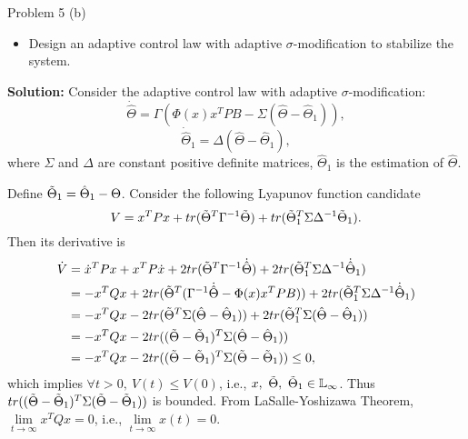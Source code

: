 \documentclass[8pt]{beamer}
\begin{document}
\begin{frame}[t]{Problem 5 (b)}
  \begin{block}{}
\begin{itemize}
  \item[(b)] Design an adaptive control law with adaptive $\sigma$-modification to stabilize the system.
\end{itemize}
  \end{block}

\textbf{Solution:}
Consider the adaptive control law with adaptive $\sigma$-modification:
    \begin{equation*}
        \dot{\hat{\Theta}}=\Gamma(\Phi(x)x^TPB-\Sigma(\hat{\Theta}-\hat{\Theta}_1)),
    \end{equation*}
    \begin{equation*}
        \dot{\hat{\Theta}}_1=\Delta(\hat{\Theta}-\hat{\Theta}_1),
    \end{equation*}
    where $\Sigma$ and $\Delta$ are constant positive definite matrices, ${\hat{\Theta}}_1$ is the estimation of $\hat{\Theta}$.

    Define $\Tilde{\Theta}_1=\hat{\Theta}_1-\Theta$. Consider the following Lyapunov function candidate
    \begin{equation*}
        V=x^TPx+tr(\Tilde{\Theta}^T\Gamma^{-1}\Tilde{\Theta})+tr(\Tilde{\Theta}_1^T\Sigma\Delta^{-1}\Tilde{\Theta}_1).
    \end{equation*}
    Then its derivative is
    \begin{align*}
        \dot V&=\dot x^TPx+x^TP\dot x+2tr(\Tilde{\Theta}^T\Gamma^{-1}\dot{\hat{\Theta}})+2tr(\Tilde{\Theta}_1^T\Sigma\Delta^{-1}\dot{\hat{\Theta}}_1) \\
        &=-x^TQx+2tr(\Tilde{\Theta}^T(\Gamma^{-1}\dot{\hat{\Theta}}-\Phi(x)x^TPB))+2tr(\Tilde{\Theta}_1^T\Sigma\Delta^{-1}\dot{\hat{\Theta}}_1) \\
        &=-x^TQx-2tr(\Tilde{\Theta}^T\Sigma(\hat{\Theta}-\hat{\Theta}_1))+2tr(\Tilde{\Theta}_1^T\Sigma(\hat{\Theta}-\hat{\Theta}_1)) \\
        &=-x^TQx-2tr((\Tilde{\Theta}-\Tilde{\Theta}_1)^T\Sigma(\hat{\Theta}-\hat{\Theta}_1)) \\
        &=-x^TQx-2tr((\Tilde{\Theta}-\Tilde{\Theta}_1)^T\Sigma(\Tilde{\Theta}-\Tilde{\Theta}_1)) \le 0,
    \end{align*}
  which implies $\forall t >0,\ V(t) \le V(0)$, i.e., $x, \ \Tilde{\Theta}, \ \Tilde{\Theta}_1 \in \mathbb{L}_{\infty}$. 
  Thus $tr((\Tilde{\Theta}-\Tilde{\Theta}_1)^T\Sigma(\Tilde{\Theta}-\Tilde{\Theta}_1))$ is bounded. From LaSalle-Yoshizawa Theorem, $\lim\limits_{t\to\infty}x^TQx=0$, i.e., $\lim\limits_{t\to\infty}x(t)=0$.
\end{frame}
\end{document}
